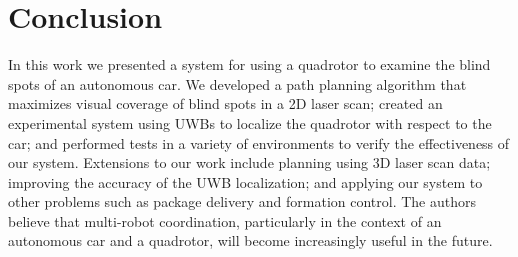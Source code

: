 
\section{Conclusion}

In this work we presented a system for using a quadrotor to examine the blind spots of an autonomous car. We developed a path planning algorithm that maximizes visual coverage of blind spots in a 2D laser scan; created an experimental system using UWBs to localize the quadrotor with respect to the car; and performed tests in a variety of environments to verify the effectiveness of our system. Extensions to our work include planning using 3D laser scan data; improving the accuracy of the UWB localization; and applying our system to other problems such as package delivery and formation control. The authors believe that multi-robot coordination, particularly in the context of an autonomous car and a quadrotor, will become increasingly useful in the future.